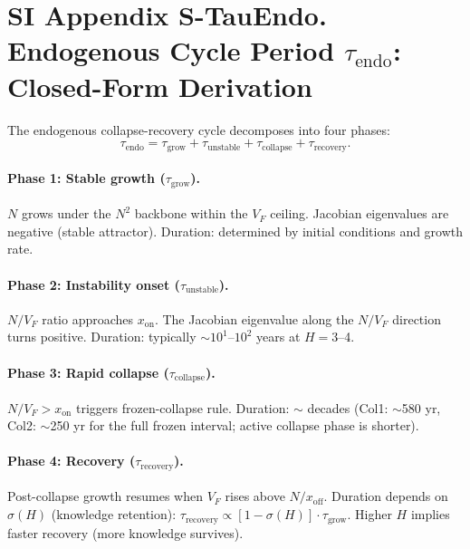\documentclass[11pt]{article}
\begin{document}

\section*{SI Appendix S-TauEndo. Endogenous Cycle Period $\tau_{\mathrm{endo}}$: Closed-Form Derivation}

The endogenous collapse-recovery cycle decomposes into four phases:
\[
\tau_{\mathrm{endo}} = \tau_{\mathrm{grow}} + \tau_{\mathrm{unstable}} + \tau_{\mathrm{collapse}} + \tau_{\mathrm{recovery}}.
\]

\paragraph{Phase 1: Stable growth ($\tau_{\mathrm{grow}}$).}
$N$ grows under the $N^2$ backbone within the $V_F$ ceiling.
Jacobian eigenvalues are negative (stable attractor).
Duration: determined by initial conditions and growth rate.

\paragraph{Phase 2: Instability onset ($\tau_{\mathrm{unstable}}$).}
$N/V_F$ ratio approaches $x_{\mathrm{on}}$.
The Jacobian eigenvalue along the $N/V_F$ direction turns positive.
Duration: typically $\sim 10^1$--$10^2$ years at $H=3$--4.

\paragraph{Phase 3: Rapid collapse ($\tau_{\mathrm{collapse}}$).}
$N/V_F > x_{\mathrm{on}}$ triggers frozen-collapse rule.
Duration: $\sim$ decades (Col1: $\sim$580 yr, Col2: $\sim$250 yr for the full frozen interval; active collapse phase is shorter).

\paragraph{Phase 4: Recovery ($\tau_{\mathrm{recovery}}$).}
Post-collapse growth resumes when $V_F$ rises above $N/x_{\mathrm{off}}$.
Duration depends on $\sigma(H)$ (knowledge retention): $\tau_{\mathrm{recovery}} \propto [1 - \sigma(H)] \cdot \tau_{\mathrm{grow}}$.
Higher $H$ implies faster recovery (more knowledge survives).
\end{document}
